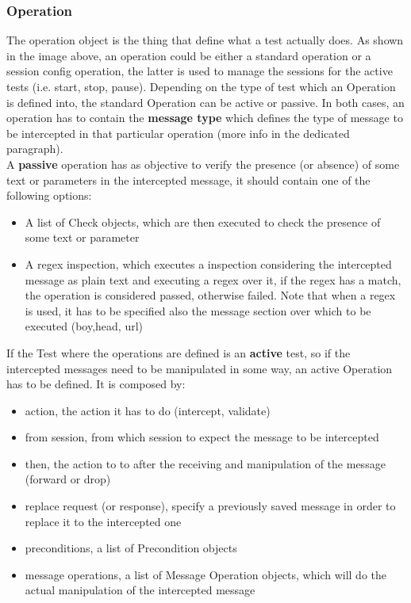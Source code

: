 \subsubsection{Operation}
The operation object is the thing that define what a test actually does. As shown in the image above, an operation could be either a standard operation or a session config operation, the latter is used to manage the sessions for the active tests (i.e. start, stop, pause). Depending on the type of test which an Operation is defined into, the standard Operation can be active or passive.
In both cases, an operation has to contain the \textbf{message type} which defines the type of message to be intercepted in that particular operation (more info in the dedicated paragraph).
\\A \textbf{passive} operation has as objective to verify the presence (or absence) of some text or parameters in the intercepted message, it should contain one of the following options:
\begin{itemize}
    \item A list of Check objects, which are then executed to check the presence of some text or parameter
    \item A regex inspection, which executes a inspection considering the intercepted message as plain text and executing a regex over it, if the regex has a match, the operation is considered passed, otherwise failed. Note that when a regex is used, it has to be specified also the message section over which to be executed (boy,head, url)
\end{itemize}

If the Test where the operations are defined is an \textbf{active} test, so if the intercepted messages need to be manipulated in some way, an active Operation has to be defined. It is composed by:
\begin{itemize}
    \item action, the action it has to do (intercept, validate)
    \item from session, from which session to expect the message to be intercepted
    \item then, the action to to after the receiving and manipulation of the message (forward or drop)
    \item replace request (or response), specify a previously saved message in order to replace it to the intercepted one
    \item preconditions, a list of Precondition objects
    \item message operations, a list of Message Operation objects, which will do the actual manipulation of the intercepted message
\end{itemize}

